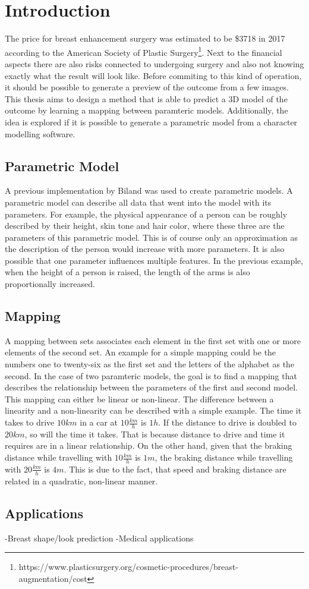 \setcounter{chapter}{0}

\chapter{Introduction}

The price for breast enhancement surgery was estimated to be \$3718 in 2017 according to the American Society of Plastic Surgery\footnote{https://www.plasticsurgery.org/cosmetic-procedures/breast-augmentation/cost}. Next to the financial aspects there are also risks connected to undergoing surgery and also not knowing exactly what the result will look like. Before commiting to this kind of operation, it should be possible to generate a preview of the outcome from a few images. This thesis aims to design a method that is able to predict a 3D model of the outcome by learning a mapping between paramteric models. Additionally, the idea is explored if it is possible to generate a parametric model from a character modelling software.




\section{Parametric Model}
A previous implementation by Biland \cite{Biland17} was used to create parametric models. A parametric model can describe all data that went into the model with its parameters. For example, the physical appearance of a person can be roughly described by their height, skin tone and hair color, where these three are the parameters of this parametric model. This is of course only an approximation as the description of the person would increase with more parameters. It is also possible that one parameter influences multiple features. In the previous example, when the height of a person is raised, the length of the arms is also proportionally increased.

\section{Mapping}
A mapping between sets associates each element in the first set with one or more elements of the second set. An example for a simple mapping could be the numbers one to twenty-six as the first set and the letters of the alphabet as the second. In the case of two paramteric models, the goal is to find a mapping that describes the relationship between the parameters of the first and second model. This mapping can either be linear or non-linear. The difference between a linearity and a non-linearity can be described with a simple example. The time it takes to drive $10km$ in a car at $10\frac{km}{h}$ is $1h$. If the distance to drive is doubled to $20km$, so will the time it takes. That is because distance to drive and time it requires are in a linear relationship. On the other hand, given that the braking distance while travelling with $10\frac{km}{h}$ is $1m$, the braking distance while travelling with $20\frac{km}{h}$ is $4m$. This is due to the fact, that speed and braking distance are related in a quadratic, non-linear manner.

\section{Applications}
-Breast shape/look prediction
-Medical applications
